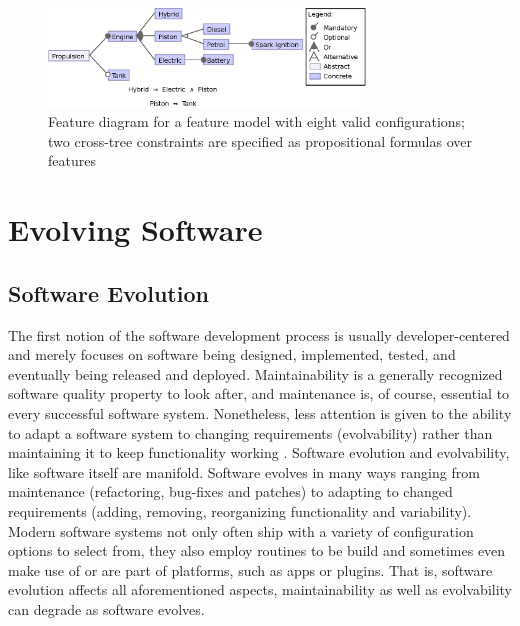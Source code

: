 \begin{figure}[htbp]
  \centering
  
  	\includegraphics[width=0.75\textwidth]{images/introduction_fm.eps}
  \caption{Feature diagram for a feature model with eight valid configurations;
  two cross-tree constraints are specified as propositional formulas over
  features}
  \label{fig:introduction_fm}
\end{figure}

\section{Evolving Software} \label{sec:2.1}
\subsection{Software Evolution}
The first notion of the software development process is usually
developer-centered and merely focuses on software being designed, implemented,
tested, and eventually being released and deployed.
{\color{blue}Maintainability is a generally recognized software quality
property to look after, and maintenance is, of course, essential to every successful software system}. Nonetheless, less
attention is given to the ability to adapt a software system to changing
requirements (evolvability) rather than maintaining it to keep functionality
working \citep{parnas_software_1994}. Software evolution and evolvability, like
software itself are manifold. Software evolves in many ways ranging from maintenance (refactoring,
bug-fixes and patches) to adapting to changed requirements (adding, removing,
reorganizing functionality and variability).
Modern software systems not only often ship with a variety of configuration
options to select from, they also employ routines to be build and sometimes even
make use of or are part of platforms, such as apps or plugins. That is,
software evolution affects all aforementioned aspects, maintainability as
well as evolvability can degrade as software evolves.

